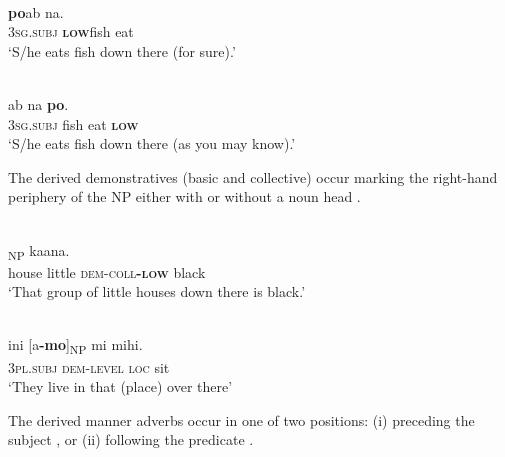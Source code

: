 \ea%
\label{ex:7:13}
 \\
 \textbf{{po}}{ab}    {na.} \\
    \textsc{3sg.subj} \textbf{\textsc{low}}fish  eat\\
\glt  `S/he eats fish down there (for sure).'
\z

 

 
\ea%
\label{ex:7:14}
 \\
  ab    na \textbf{{po}}{.}\\
  \textsc{3sg.subj} fish  eat  \textbf{\textsc{low}}   \\
\glt   `S/he eats fish down there (as you may know).'
\z
 


  





The derived demonstratives (basic and collective) occur marking the right-hand periphery of the NP either with  or without a noun head .



\ea%
\label{ex:7:15}
 \\
\textsubscript{NP} ka{\textglotstop}ana.\\
    house  little  \textsc{dem-coll}\textbf{\textsc{-low}} black \\
\glt `That group of little houses down there is black.'
\z

  



  



\ea%
\label{ex:7:16}
 \\
\gll {\textglotstop}ini [{\textglotstop}{a}\textbf{-mo}]\textsubscript{NP} mi   {mihi.}\\
   \textsc{3pl.subj} \textsc{dem-level} \textsc{loc} sit \\
\glt `They live in that (place) over there'
\z

  

 

  

The derived manner adverbs occur in one of two positions: (i) preceding the subject , or (ii) following the predicate .



